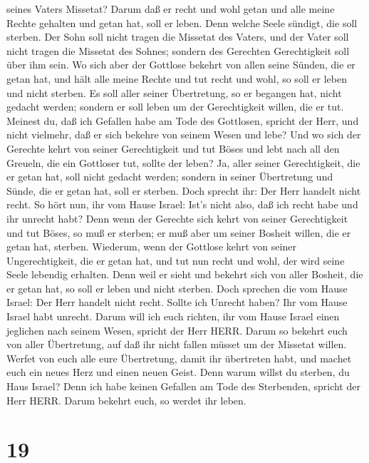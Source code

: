 seines Vaters Missetat? Darum daß er recht und wohl getan und alle meine
Rechte gehalten und getan hat, soll er leben.  Denn welche
Seele sündigt, die soll sterben. Der Sohn soll nicht tragen die Missetat
des Vaters, und der Vater soll nicht tragen die Missetat des Sohnes;
sondern des Gerechten Gerechtigkeit soll über ihm sein.  Wo
sich aber der Gottlose bekehrt von allen seine Sünden, die er getan hat,
und hält alle meine Rechte und tut recht und wohl, so soll er leben und
nicht sterben.  Es soll aller seiner Übertretung, so er
begangen hat, nicht gedacht werden; sondern er soll leben um der
Gerechtigkeit willen, die er tut.  Meinest du, daß ich
Gefallen habe am Tode des Gottlosen, spricht der Herr, und nicht
vielmehr, daß er sich bekehre von seinem Wesen und lebe? 
Und wo sich der Gerechte kehrt von seiner Gerechtigkeit und tut Böses
und lebt nach all den Greueln, die ein Gottloser tut, sollte der leben?
Ja, aller seiner Gerechtigkeit, die er getan hat, soll nicht gedacht
werden; sondern in seiner Übertretung und Sünde, die er getan hat, soll
er sterben.  Doch sprecht ihr: Der Herr handelt nicht
recht. So hört nun, ihr vom Hause Israel: Ist's nicht also, daß ich
recht habe und ihr unrecht habt?  Denn wenn der Gerechte
sich kehrt von seiner Gerechtigkeit und tut Böses, so muß er sterben; er
muß aber um seiner Bosheit willen, die er getan hat, sterben.
 Wiederum, wenn der Gottlose kehrt von seiner
Ungerechtigkeit, die er getan hat, und tut nun recht und wohl, der wird
seine Seele lebendig erhalten.  Denn weil er sieht und
bekehrt sich von aller Bosheit, die er getan hat, so soll er leben und
nicht sterben.  Doch sprechen die vom Hause Israel: Der
Herr handelt nicht recht. Sollte ich Unrecht haben? Ihr vom Hause Israel
habt unrecht.  Darum will ich euch richten, ihr vom Hause
Israel einen jeglichen nach seinem Wesen, spricht der Herr HERR. Darum
so bekehrt euch von aller Übertretung, auf daß ihr nicht fallen müsset
um der Missetat willen.  Werfet von euch alle eure
Übertretung, damit ihr übertreten habt, und machet euch ein neues Herz
und einen neuen Geist. Denn warum willst du sterben, du Haus Israel?
 Denn ich habe keinen Gefallen am Tode des Sterbenden,
spricht der Herr HERR. Darum bekehrt euch, so werdet ihr leben.

\hypertarget{section-18}{%
\section{19}\label{section-18}}

